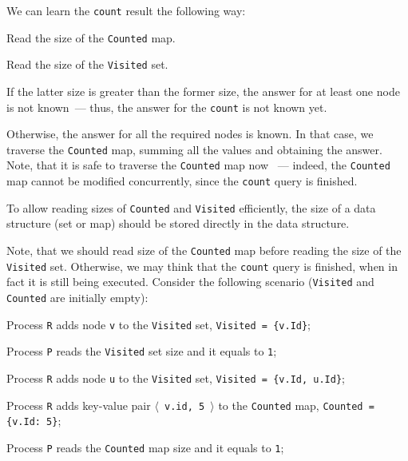 \documentclass[times, dvipsnames,%
               languages={russian,english} %
              ]{itmo-student-thesis}
\begin{document}
We can learn the \texttt{count} result the following way:

\begin{nenum}
    \item Read the size of the \texttt{Counted} map.
    
    \item Read the size of the \texttt{Visited} set.
    
    \item If the latter size is greater than the former size, the answer for at least one node is not known~--- thus, the answer for the \texttt{count} is not known yet.
    
    \item Otherwise, the answer for all the required nodes is known. In that case, we traverse the \texttt{Counted} map, summing all the values and obtaining the answer. Note, that it is safe to traverse the \texttt{Counted} map now ~--- indeed, the \texttt{Counted} map cannot be modified concurrently, since the \texttt{count} query is finished.
\end{nenum}

\bigbreak

To allow reading sizes of \texttt{Counted} and \texttt{Visited} efficiently, the size of a data structure (set or map) should be stored directly in the data structure.

Note, that we should read size of the \texttt{Counted} map before reading the size of the \texttt{Visited} set. Otherwise, we may think that the \texttt{count} query is finished, when in fact it is still being executed. Consider the following scenario (\texttt{Visited} and \texttt{Counted} are initially empty):

\begin{nenum}
    \item Process \texttt{R} adds node \texttt{v} to the \texttt{Visited} set, \texttt{Visited = \{v.Id\}};
    
    \item Process \texttt{P} reads the \texttt{Visited} set size and it equals to \texttt{1};
    
    \item Process \texttt{R} adds node \texttt{u} to the \texttt{Visited} set, \texttt{Visited = \{v.Id, u.Id\}};
    
    \item Process \texttt{R} adds key-value pair \texttt{$\langle$ v.id, 5 $\rangle$} to the \texttt{Counted} map, \texttt{Counted = \{v.Id: 5\}};
    
    \item Process \texttt{P} reads the \texttt{Counted} map size and it equals to \texttt{1};
\end{nenum}
\end{document}
